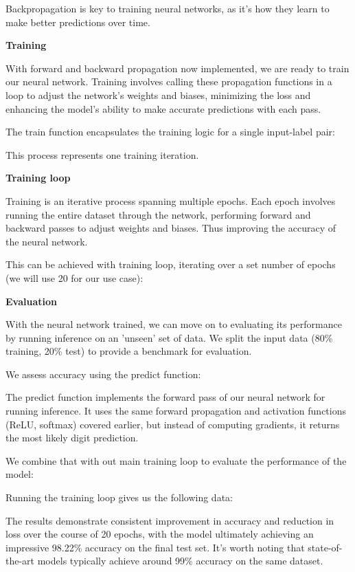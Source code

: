 Backpropagation is key to training neural networks, as it's how they learn to
make better predictions over time.

\vspace{5mm}
{\noindent\huge\bf Training}
\vspace{5mm}

With forward and backward propagation now implemented, we are ready to train
our neural network. Training involves calling these propagation functions in a
loop to adjust the network's weights and biases, minimizing the loss and
enhancing the model's ability to make accurate predictions with each pass.

The train function encapsulates the training logic for a single input-label
pair:

This process represents one training iteration. 

\vspace{5mm}
{\noindent\huge\bf Training loop}
\vspace{5mm}

Training is an iterative process spanning multiple epochs. Each epoch involves
running the entire dataset through the network, performing forward and backward
passes to adjust weights and biases. Thus improving the accuracy of the neural
network.

This can be achieved with training loop, iterating over a set number of epochs
(we will use 20 for our use case):

\vspace{5mm}
{\noindent\huge\bf Evaluation}
\vspace{5mm}

With the neural network trained, we can move on to evaluating its performance
by running inference on an 'unseen' set of data. We split the input data
(80\% training, 20\% test) to provide a benchmark for evaluation. 

We assess accuracy using the predict function:

The predict function implements the forward pass of our neural network for
running inference. It uses the same forward propagation and activation
functions (ReLU, softmax) covered earlier, but instead of computing gradients,
it returns the most likely digit prediction. 

We combine that with out main training loop to evaluate the performance of the
model:

Running the training loop gives us the following data:

The results demonstrate consistent improvement in accuracy and reduction in
loss over the course of 20 epochs, with the model ultimately achieving an
impressive 98.22\% accuracy on the final test set. It's worth noting that
state-of-the-art models typically achieve around 99\% accuracy on the same
dataset. 

